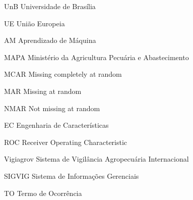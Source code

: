 \begin{siglas}
  \item[UnB] Universidade de Brasília
 	\item[UE] União Europeia
	\item[AM] Aprendizado de Máquina
	\item[MAPA] Ministério da Agricultura Pecuária e Abastecimento
	\item[MCAR] Missing completely at random
	\item[MAR] Missing at random
	\item[NMAR] Not missing at random
	\item[EC] Engenharia de Características
	\item[ROC] Receiver Operating Characteristic
	\item[Vigiagrov] Sistema de Vigilância 	Agropecuária Internacional
	\item[SIGVIG] Sistema de Informações Gerenciais
	\item[TO] Termo de Ocorrência
\end{siglas}
